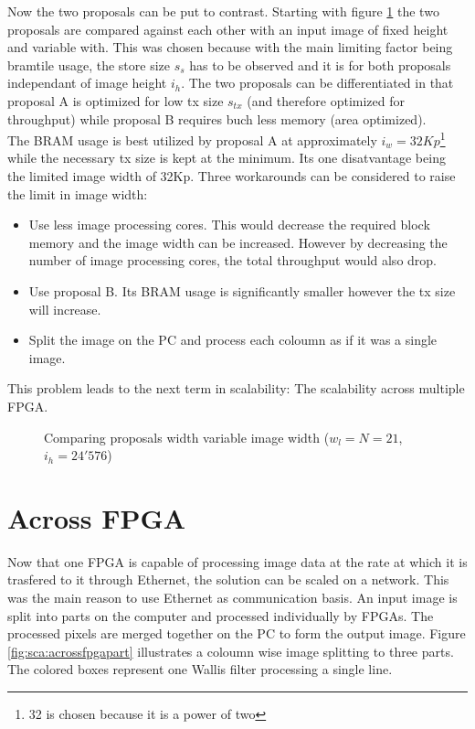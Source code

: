 Now the two proposals can be put to contrast. Starting with figure 
\ref{fig:sca:compfixheight} the two proposals are compared against each other
with an input image of fixed height and variable with. This was chosen because
with the main limiting factor being \gls{bramtile} usage, the store size $s_s$ has to
be observed and it is for both proposals independant of image height $i_h$. The
two proposals can be differentiated in that proposal A is optimized for low tx
size $s_{tx}$ (and therefore optimized for throughput) while proposal B requires
buch less memory (area optimized). 
\\
The BRAM usage is best utilized by proposal A at approximately
$i_w=32Kp$\footnote{32 is chosen because it is a power of two} while
the necessary tx size is kept at the minimum. Its one disatvantage being the
limited image width of 32Kp. Three workarounds can be considered to raise the
limit in image width:
\begin{itemize}
    \item Use less image processing cores. This would decrease the required
    block memory and the image width can be increased. However by decreasing the
    number of image processing cores, the total throughput would also drop.
    \item Use proposal B. Its BRAM usage is significantly smaller however the tx
    size will increase.
    \item Split the image on the PC and process each coloumn as if it was a
    single image.
\end{itemize}

This problem leads to the next term in scalability: The scalability across
multiple FPGA.

\begin{figure}[tb!]
    \centering
    \begin{adjustbox}{max width=\linewidth}
        
    \end{adjustbox}
    \caption{Comparing proposals width variable image width ($w_l=N=21$,
    $i_h=24'576$)}
    \label{fig:sca:compfixheight}
\end{figure}


\section{Across FPGA}
Now that one FPGA is capable of processing image data at the rate at which it is
trasfered to it through Ethernet, the solution can be scaled on a network. This
was the main reason to use Ethernet as communication basis. An input image is
split into parts on the computer and processed individually by FPGAs. The
processed pixels are merged together on the PC to form the output image. Figure
\ref{fig:sca:acrossfpgapart} illustrates a coloumn wise image splitting to three
parts. The colored boxes represent one Wallis filter processing a single line.

